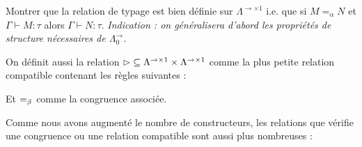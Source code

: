 \begin{exo}
    Montrer que la relation de typage est bien définie sur $\Lambda^{\to\times 1}$ i.e. que si $M=_\alpha N$ et $\Gamma\vdash M : \tau$ alors $\Gamma\vdash N : \tau$. \textit{Indication : on généralisera d'abord les propriétés de structure nécessaires de $\Lambda_0^{\to}$.}
\end{exo}

\begin{defi}
    On définit aussi la relation $\reduc\subseteq\Lambda^{\to\times 1}\times\Lambda^{\to\times 1}$ comme la plus petite relation compatible contenant les règles suivantes :
    \begin{center}
        \begin{prooftree}
        \end{prooftree}
        \qquad
        \begin{prooftree}
        \end{prooftree}
        \qquad
        \begin{prooftree}
        \end{prooftree}
    \end{center}

    Et $\beteq$ comme la congruence associée.
\end{defi}

\begin{rmk}
    Comme nous avons augmenté le nombre de constructeurs, les relations que vérifie une congruence ou une relation compatible sont aussi plus nombreuses : 
    \begin{center}
        \begin{prooftree}
        \end{prooftree}
        \qquad
        \begin{prooftree}
        \end{prooftree}

        \vspace{0.5cm}

        \begin{prooftree}
        \end{prooftree}
        \qquad
        \begin{prooftree}
        \end{prooftree}
    \end{center}
\end{rmk}

